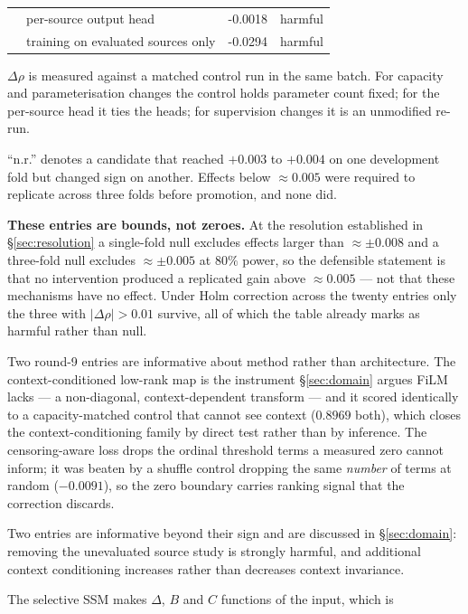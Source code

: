 \documentclass[11pt]{article}
\newcommand{\rhoS}{\rho}
\begin{document}
\begin{table}[H]
\begin{threeparttable}
\begin{tabular}{l l S[table-format=+1.4] l}
 & per-source output head              & -0.0018 & harmful \\
 & training on evaluated sources only  & -0.0294 & harmful \\
\bottomrule
\end{tabular}
\begin{tablenotes}[flushleft]\footnotesize
\item $\Delta\rhoS$ is measured against a matched control run in the same batch. For
capacity and parameterisation changes the control holds parameter count fixed; for the
per-source head it ties the heads; for supervision changes it is an unmodified re-run.
\item ``n.r.'' denotes a candidate that reached $+0.003$ to $+0.004$ on one development
fold but changed sign on another. Effects below $\approx0.005$ were required to
replicate across three folds before promotion, and none did.
\item \textbf{These entries are bounds, not zeroes.} At the resolution established in
\S\ref{sec:resolution} a single-fold null excludes effects larger than
$\approx\pm0.008$ and a three-fold null excludes $\approx\pm0.005$ at $80\%$ power, so
the defensible statement is that no intervention produced a replicated gain above
$\approx0.005$ --- not that these mechanisms have no effect. Under Holm correction
\citep{holm1979} across the twenty entries only the three with $|\Delta\rhoS|>0.01$
survive, all of which the table already marks as harmful rather than null.
\item Two round-9 entries are informative about method rather than architecture. The
context-conditioned low-rank map is the instrument \S\ref{sec:domain} argues FiLM lacks
--- a non-diagonal, context-dependent transform --- and it scored identically to a
capacity-matched control that cannot see context ($0.8969$ both), which closes the
context-conditioning family by direct test rather than by inference. The
censoring-aware loss drops the ordinal threshold terms a measured zero cannot inform;
it was beaten by a shuffle control dropping the same \emph{number} of terms at random
($-0.0091$), so the zero boundary carries ranking signal that the correction discards.
\item Two entries are informative beyond their sign and are discussed in
\S\ref{sec:domain}: removing the unevaluated source study is strongly harmful, and
additional context conditioning increases rather than decreases context invariance.
\item The selective SSM makes $\Delta$, $B$ and $C$ functions of the input, which is

\end{tablenotes}
\end{threeparttable}
\end{table}
\end{document}
